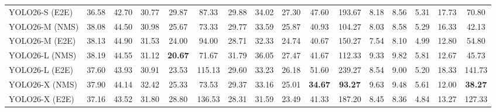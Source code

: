 \begin{table}[!thb]
\begin{tabular}{l *{15}{c}}
YOLO26-S (E2E) & 36.58 & 42.70 & 30.77 & 29.87 &  87.33 & 29.88 & 34.02 & 27.30 & 47.60 & 193.67 &  8.18 &  8.56 & 5.31 & 17.73 &  70.80 \\
YOLO26-M (NMS) & 38.08 & 44.50 & 30.98 & 25.67 &  73.33 & 29.77 & 33.59 & 25.87 & 40.93 & 104.27 &  8.03 &  8.58 & 5.29 & 16.33 &  42.13 \\
YOLO26-M (E2E) & 38.13 & 44.90 & 31.53 & 24.00 &  94.00 & 28.71 & 32.33 & 24.74 & 40.67 & 150.27 &  7.54 &  8.10 & 4.99 & 12.80 &  54.80 \\
YOLO26-L (NMS) & 38.19 & 44.55 & 31.12 & \textbf{20.67} &  71.67 & 31.79 & 36.05 & 27.47 & 41.67 & 112.33 &  9.33 &  9.82 & 5.81 & 12.67 &  45.73 \\
YOLO26-L (E2E) & 37.60 & 43.93 & 30.91 & 23.53 & 115.13 & 29.60 & 33.23 & 26.18 & 51.60 & 239.27 &  8.54 &  9.00 & 5.20 & 18.33 & 141.73 \\
YOLO26-X (NMS) & 37.90 & 44.14 & 32.42 & 25.33 &  73.53 & 29.37 & 33.16 & 25.01 & \textbf{34.67} & \textbf{93.27} &  9.63 &  9.48 & 5.61 & 12.00 & \textbf{38.27} \\
YOLO26-X (E2E) & 37.16 & 43.52 & 31.80 & 28.80 & 136.53 & 28.31 & 31.59 & 23.49 & 41.33 & 187.20 &  8.45 &  8.36 & 4.84 & 13.27 & 127.33 \\
\bottomrule
\end{tabular}
\end{table}